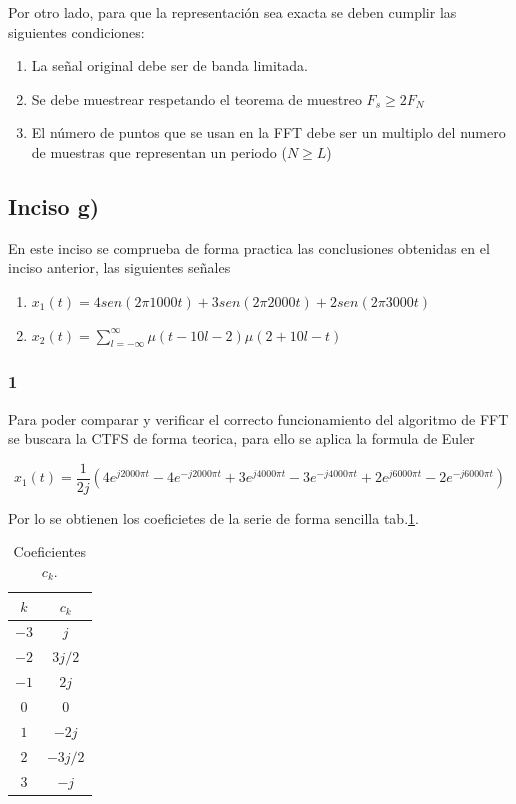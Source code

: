 \documentclass[letterpaper]{article}
\begin{document}
    Por otro lado, para que la representación sea exacta se deben cumplir las siguientes condiciones:
    \begin{enumerate}
        \item La señal original debe ser de banda limitada.
        \item Se debe muestrear respetando el teorema de muestreo $F_s\geq 2F_N$
        \item El número de puntos que se usan en la FFT debe ser un multiplo del numero de muestras que representan un periodo ($N\geq L$)
    \end{enumerate}

    \subsection*{Inciso g)}

    En este inciso se comprueba de forma practica las conclusiones obtenidas en 
    el inciso anterior, las siguientes señales 
    
    \begin{enumerate}
        \item $x_1(t)= 4 sen( 2\pi 1000 t ) + 3sen( 2\pi 2000 t ) + 2sen( 2\pi 3000 t )$
        \item $ x_2(t)= \sum_{l=-\infty}^{\infty} \mu( t - 10l - 2  )\mu( 2 + 10l - t )$
    \end{enumerate}

    \subsubsection*{1}

    Para poder comparar y verificar el correcto funcionamiento del algoritmo de FFT
    se buscara la CTFS de forma teorica, para ello se aplica la formula de Euler
    
    \begin{equation}
        x_1(t) = \frac{1}{2j} ( 4e^{j2000 \pi t} - 4e^{-j2000 \pi t}  +3e^{j4000 \pi t} - 3e^{-j4000 \pi t} +2e^{j6000 \pi t} - 2e^{-j6000 \pi t} )
    \end{equation}

    

    Por lo se obtienen los coeficietes de la serie de forma sencilla tab.\ref{tab.2gi}.

    \begin{table}[H]
        \centering
        \begin{tabular}{|c|c|}
            \hline $k$ & $c_k$ \\ 
            \hline $-3$ & $j$ \\
            \hline $-2$ & $3j/2$ \\ 
            \hline $-1$ & $2j$ \\ 
            \hline $0$ & $0$ \\ 
            \hline $1$ & $-2j$ \\ 
            \hline $2$ & $-3j/2$ \\ 
            \hline $3$ & $-j$ \\ 
            \hline
        \end{tabular}
        \caption{Coeficientes $c_k$.}
        \label{tab.2gi}
    \end{table}
\end{document}
